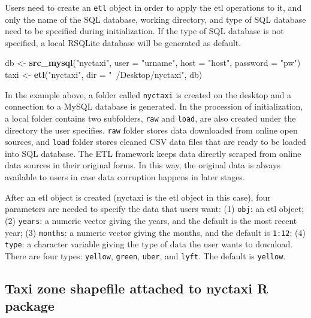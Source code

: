 \documentclass[12pt,twoside]{reedthesis}
\newenvironment{Shaded}{\begin{snugshade}}{\end{snugshade}}
\newcommand{\KeywordTok}[1]{\textcolor[rgb]{0.13,0.29,0.53}{\textbf{#1}}}
\newcommand{\DataTypeTok}[1]{\textcolor[rgb]{0.13,0.29,0.53}{#1}}
\newcommand{\StringTok}[1]{\textcolor[rgb]{0.31,0.60,0.02}{#1}}
\newcommand{\NormalTok}[1]{#1}
\theoremstyle{definition}
\theoremstyle{definition}
\theoremstyle{definition}
\theoremstyle{remark}
\begin{document}
Users need to create an \texttt{etl} object in order to apply the etl
operations to it, and only the name of the SQL database, working
directory, and type of SQL database need to be specified during
initialization. If the type of SQL database is not specified, a local
RSQLite database will be generated as default.
\begin{Shaded}
\begin{Highlighting}[]
\NormalTok{db <-}\StringTok{ }\KeywordTok{src_mysql}\NormalTok{(}\StringTok{"nyctaxi"}\NormalTok{, }\DataTypeTok{user =} \StringTok{"urname"}\NormalTok{, }\DataTypeTok{host =} \StringTok{"host"}\NormalTok{, }\DataTypeTok{password =} \StringTok{"pw"}\NormalTok{)}
\NormalTok{taxi <-}\StringTok{ }\KeywordTok{etl}\NormalTok{(}\StringTok{"nyctaxi"}\NormalTok{, }\DataTypeTok{dir =} \StringTok{"~/Desktop/nyctaxi"}\NormalTok{, db)}
\end{Highlighting}
\end{Shaded}
In the example above, a folder called \texttt{nyctaxi} is created on the
desktop and a connection to a MySQL database is generated. In the
procession of initialization, a local folder contains two subfolders,
\texttt{raw} and \texttt{load}, are also created under the directory the
user specifies. \texttt{raw} folder stores data downloaded from online
open sources, and \texttt{load} folder stores cleaned CSV data files
that are ready to be loaded into SQL database. The ETL framework keeps
data directly scraped from online data sources in their original forms.
In this way, the original data is always available to users in case data
corruption happens in later stages.

After an etl object is created (nyctaxi is the etl object in this case),
four parameters are needed to specify the data that users want: (1)
\texttt{obj}: an etl object; (2) \texttt{years}: a numeric vector giving
the years, and the default is the most recent year; (3) \texttt{months}:
a numeric vector giving the months, and the default is \texttt{1:12};
(4) \texttt{type}: a character variable giving the type of data the user
wants to download. There are four types: \texttt{yellow},
\texttt{green}, \texttt{uber}, and \texttt{lyft}. The default is
\texttt{yellow}.

\subsection{\texorpdfstring{Taxi zone shapefile attached to nyctaxi
\textbf{R}
package}{Taxi zone shapefile attached to nyctaxi R package}}\label{taxi-zone-shapefile-attached-to-nyctaxi-r-package}
\end{document}

